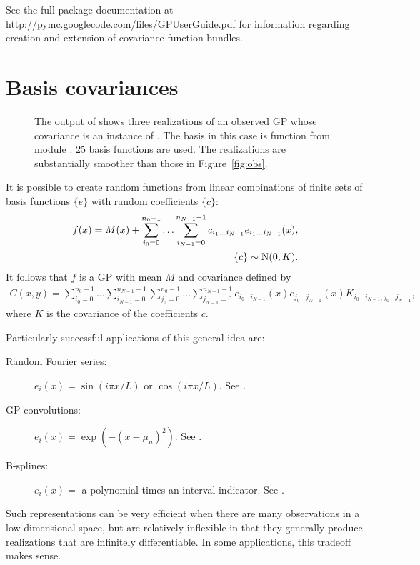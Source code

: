 \documentclass[article]{jss}
\begin{document}
See the full package documentation at \href{http://pymc.googlecode.com/files/GPUserGuide.pdf}{http://pymc.googlecode.com/files/GPUserGuide.pdf} for information regarding creation and extension of covariance function bundles.

\section{Basis covariances}\label{sec:basis}

\begin{figure}[htbp]
    \centering
        \caption{The output of  shows three realizations of an observed GP whose covariance is an instance of . The basis in this case is function  from module . 25 basis functions are used. The realizations are substantially smoother than those in Figure~\ref{fig:obs}.}
    \label{fig:basiscov}
\end{figure}

It is possible to create random functions from linear combinations of finite sets of basis functions $\{e\}$ with random coefficients $\{c\}$:
\begin{eqnarray*}
    f(x) = M(x) + \sum_{i_0=0}^{n_0-1}\ldots \sum_{i_{N-1}=0}^{n_{N-1}-1} c_{i_1\ldots i_{N-1}} e_{i_1\ldots i_{N-1}}(x), \\
    \{c\}\sim \textup{N}(0,K).
\end{eqnarray*}
It follows that $f$ is a GP with mean $M$ and covariance defined by
\begin{eqnarray*}
    C(x,y)=\sum_{i_0=0}^{n_0-1}\ldots \sum_{i_{N-1}=0}^{n_{N-1}-1} \sum_{j_0=0}^{n_0-1}\ldots \sum_{j_{N-1}=0}^{n_{N-1}-1} e_{i_0\ldots i_{N-1}}(x) e_{j_0\ldots j_{N-1}}(x) K_{i_0\ldots i_{N-1}, j_0\ldots j_{N-1}},
\end{eqnarray*}
where $K$ is the covariance of the coefficients $c$.

Particularly successful applications of this general idea are:
\begin{description}
    \item[Random Fourier series:] $e_i(x) = \sin(i\pi x/L)$ or $\cos(i\pi x/L)$. See \cite{spanos}.
    \item[GP convolutions:] $e_i(x) = \exp(-(x-\mu_n)^2)$. See \cite{convolution}.
    \item[B-splines:] $e_i(x) = $ a polynomial times an interval indicator. See .
\end{description}
Such representations can be very efficient when there are many observations in a low-dimensional space, but are relatively inflexible in that they generally produce realizations that are infinitely differentiable. In some applications, this tradeoff makes sense.
\end{document}
